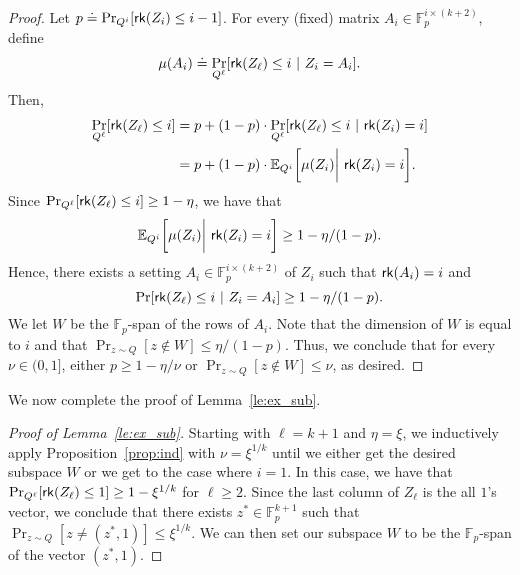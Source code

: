 \begin{proof}
Let $p \doteq \Pr_{Q^i}[\mathsf{rk}(Z_{i}) \le i-1]$. For every (fixed) matrix $A_i \in \mathbb{F}_p^{i \times (k+2)}$, define
$$\mu(A_i) \doteq \Pr_{Q^\ell}[\mathsf{rk}(Z_{\ell}) \le i ~ | ~ Z_{i} = A_i].$$
Then,
\begin{align*}
\Pr_{Q^{\ell}}[\mathsf{rk}(Z_{\ell}) \le i] &= p+(1-p)\cdot \Pr_{Q^{\ell}}[\mathsf{rk}(Z_{\ell}) \le i ~ | ~ \mathsf{rk}(Z_{i}) = i]\\
&= p+(1-p)\cdot \mathbb E_{ Q^i}\bigg[\mu(Z_i) \bigg| ~ \mathsf{rk}(Z_{i}) = i \bigg].
\end{align*}
Since $\Pr_{Q^{\ell}}[\mathsf{rk}(Z_{\ell}) \le i] \geq 1-\eta$, we have that
$$  \mathbb E_{ Q^i}\bigg[\mu(Z_i) \bigg| ~ \mathsf{rk}(Z_{i}) = i \bigg] \geq 1 - \eta/(1-p). $$
Hence, there exists a setting $A_i \in \mathbb{F}_p^{i \times (k+2)}$ of $Z_{i}$  such that $\mathsf{rk}(A_{i}) = i$ and
$$\Pr[\mathsf{rk}(Z_{\ell}) \le i ~ | ~ Z_{i} = A_{i}] \geq 1 - \eta/(1-p).$$
We let $W$ be the $\mathbb{F}_p$-span of the rows of $A_{i}$. Note that the dimension of $W$ is equal to $i$ and that $\Pr_{z \sim Q}[z \notin W] \le \eta/(1-p)$. Thus, we conclude that for every $\nu \in (0,1]$, either $p \geq 1-\eta/\nu$ or $\Pr_{z \sim Q}[z \notin W] \le \nu$, as desired.
\end{proof}

We now complete the proof of Lemma~\ref{le:ex_sub}.
\begin{proof}[Proof of Lemma~\ref{le:ex_sub}]
Starting with $\ell = k+1$ and $\eta = \xi$, we inductively apply Proposition~\ref{prop:ind} with $\nu = \xi^{1/k}$ until we either get the desired subspace $W$ or we get to the case where $i=1$. In this case, we have that $\Pr_{Q^{\ell}}[\mathsf{rk}(Z_{\ell}) \le 1] \geq 1-\xi^{1/k}$ for $\ell \geq 2$. Since the last column of $Z_{\ell}$ is the all $1$'s vector, we conclude that there exists $z^* \in \mathbb{F}_p^{k+1}$ such that $\Pr_{z \sim Q}[z \neq (z^*,1)] \le \xi^{1/k}$. We can then set our subspace $W$ to be the $\mathbb{F}_p$-span of the vector $(z^*,1)$.
\end{proof}

